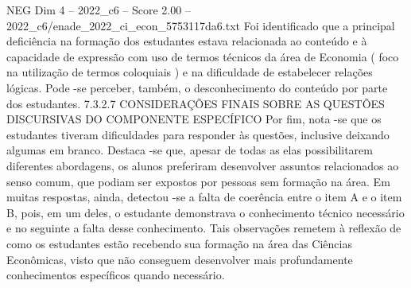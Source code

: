 \begin{textsample}{NEG Dim 4 – 2022\_c6 – Score 2.00 – 2022\_c6/enade\_2022\_ci\_econ\_5753117da6.txt}
Foi identificado que a principal deficiência na formação dos estudantes estava relacionada ao conteúdo e à capacidade de expressão com uso de termos técnicos da área de Economia ( foco na utilização de termos coloquiais ) e na dificuldade de estabelecer relações lógicas.
Pode -se perceber, também, o desconhecimento do conteúdo por parte dos estudantes. 7.3.2.7 CONSIDERAÇÕES FINAIS SOBRE AS QUESTÕES DISCURSIVAS DO COMPONENTE ESPECÍFICO Por fim, nota -se que os estudantes tiveram dificuldades para responder às questões, inclusive deixando algumas em branco.
Destaca -se que, apesar de todas as elas possibilitarem diferentes abordagens, os alunos preferiram desenvolver assuntos relacionados ao senso comum, que podiam ser expostos por pessoas sem formação na área.
Em muitas respostas, ainda, detectou -se a falta de coerência entre o item A e o item B, pois, em um deles, o estudante demonstrava o conhecimento técnico necessário e no seguinte a falta desse conhecimento.
Tais observações remetem à reflexão de como os estudantes estão recebendo sua formação na área das Ciências Econômicas, visto que não conseguem desenvolver mais profundamente conhecimentos específicos quando necessário.

\end{textsample}
